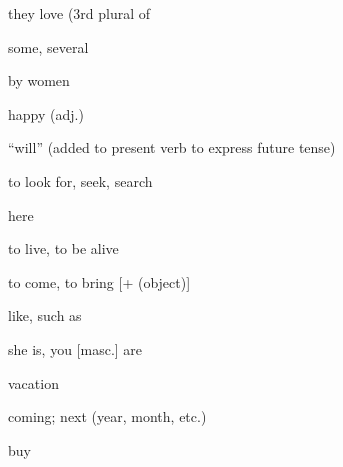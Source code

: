 \documentclass[avery5371,grid,frame]{flashcards}
\begin{document}
\begin{flashcard}{\LARGE they love (3rd plural of }
\LARGE {}
\end{flashcard}
\begin{flashcard}{\LARGE some, several}
\LARGE {}
\end{flashcard}
\begin{flashcard}{\LARGE by women}
\LARGE {}
\end{flashcard}
\begin{flashcard}{\LARGE happy (adj.)}
\LARGE {}
\end{flashcard}
\begin{flashcard}{\LARGE ``will'' (added to present verb to express future tense)}
\LARGE {}
\end{flashcard}
\begin{flashcard}{\LARGE to look for, seek, search}
\LARGE {}
\end{flashcard}
\begin{flashcard}{\LARGE here}
\LARGE {}
\end{flashcard}
\begin{flashcard}{\LARGE to live, to be alive}
\LARGE {}
\end{flashcard}
\begin{flashcard}{\LARGE to come, to bring {[}+  (object){]}}
\LARGE {}
\end{flashcard}
\begin{flashcard}{\LARGE like, such as}
\LARGE {}
\end{flashcard}
\begin{flashcard}{\LARGE she is, you {[}masc.{]} are}
\LARGE {}
\end{flashcard}
\begin{flashcard}{\LARGE vacation}
\LARGE {}
\end{flashcard}
\begin{flashcard}{\LARGE coming; next (year, month, etc.)}
\LARGE {}
\end{flashcard}
\begin{flashcard}{\LARGE buy}
\LARGE {}
\end{flashcard}
\end{document}

